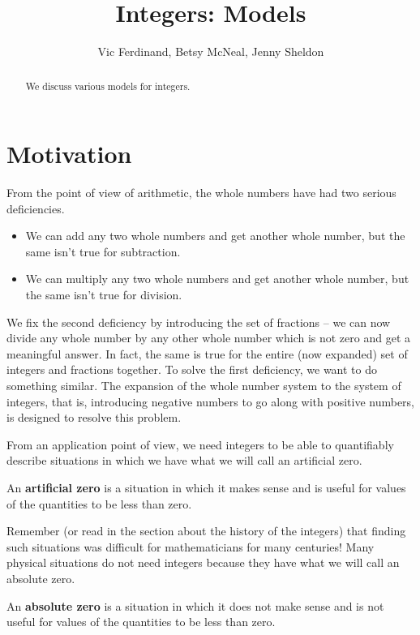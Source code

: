 \documentclass{ximera}
\title{Integers: Models}
\author{Vic Ferdinand, Betsy McNeal, Jenny Sheldon}
\begin{document}
\begin{abstract}
We discuss various models for integers.
\end{abstract}
\maketitle

\section{Motivation}

From the point of view of arithmetic, the whole numbers have had two serious deficiencies.
\begin{itemize}
	\item We can add any two whole numbers and get another whole number, but the same isn't true for subtraction.
	\item We can multiply any two whole numbers and get another whole number, but the same isn't true for division.
\end{itemize} 
We fix the second deficiency by introducing the set of fractions -- we can now divide any whole number by any other whole number which is not zero and get a meaningful answer.  In fact, the same is true for the entire (now expanded) set of integers and fractions together.  To solve the first deficiency, we want to do something similar.  The expansion of the whole number system to the system of integers, that is, introducing negative numbers to go along with positive numbers, is designed to resolve this problem.


From an application point of view, we need integers to be able to quantifiably describe situations in which we have what we will call an artificial zero.
\begin{definition}
An \textbf{artificial zero} is a situation in which it makes sense and is useful for values of the quantities to be less than zero.
\end{definition}
 Remember (or read in the section about the history of the integers) that finding such situations was difficult for mathematicians for many centuries!  Many physical situations do not need integers because they have what we will call an absolute zero.
 \begin{definition} An \textbf{absolute zero} is a situation in which it does not make sense and is not useful for values of the quantities to be less than zero.
 \end{definition}
 
\end{document}
